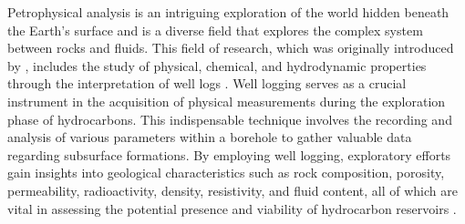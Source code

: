 \documentclass{gji}
\begin{document}
Petrophysical analysis is an intriguing exploration of the world hidden beneath the Earth's surface and is a diverse field that explores the complex system between rocks and fluids.
This field of research, which was originally introduced by \cite{archie1950introduction}, includes the study of physical, chemical, and hydrodynamic properties through the interpretation of well logs \citep{mondol2015well,buryakovsky2012fundamentals,glover2000petrophysics}.
Well logging serves as a crucial instrument in the acquisition of physical measurements during the exploration phase of hydrocarbons. 
This indispensable technique involves the recording and analysis of various parameters within a borehole to gather valuable data regarding subsurface formations.
By employing well logging, exploratory efforts gain insights into geological characteristics such as rock composition, porosity, permeability, radioactivity, density, resistivity, and fluid content, all of which are vital in assessing the potential presence and viability of hydrocarbon reservoirs \citep{ellis2007well,Tittman2012,liu2017principles}. 
\end{document}

